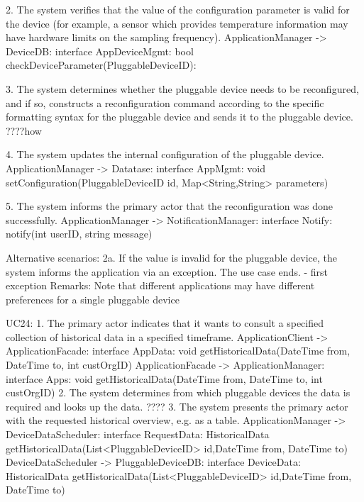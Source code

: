             2. The system verifies that the value of the configuration parameter is valid for the device (for
               example, a sensor which provides temperature information may have hardware limits on the
               sampling frequency).
               ApplicationManager -> DeviceDB: interface AppDeviceMgmt: bool checkDeviceParameter(PluggableDeviceID):

            3. The system determines whether the pluggable device needs to be reconfigured, and if so,
               constructs a reconfiguration command according to the specific formatting syntax for the
               pluggable device and sends it to the pluggable device. ????how

            4. The system updates the internal configuration of the pluggable device.
                ApplicationManager -> Datatase: interface AppMgmt:
                                                     void setConfiguration(PluggableDeviceID id, Map<String,String> parameters)

            5. The system informs the primary actor that the reconfiguration was done successfully.
                ApplicationManager -> NotificationManager: interface Notify: notify(int userID, string message)

            Alternative scenarios:
            2a. If the value is invalid for the pluggable device, the system informs the application via an
                exception. The use case ends.
                - first exception
            Remarks:
                Note that different applications may have different preferences for a single pluggable device

        UC24:
            1. The primary actor indicates that it wants to consult a specified collection of historical data in
                a specified timeframe.
                ApplicationClient -> ApplicationFacade: interface AppData:
                                                void getHistoricalData(DateTime from, DateTime to, int custOrgID)
                ApplicationFacade -> ApplicationManager: interface Apps:
                                                void getHistoricalData(DateTime from, DateTime to, int custOrgID)
            2. The system determines from which pluggable devices the data is required and looks up the data.
                 ????
            3. The system presents the primary actor with the requested historical overview, e.g. as a table.
                ApplicationManager -> DeviceDataScheduler: interface RequestData:
                                      HistoricalData getHistoricalData(List<PluggableDeviceID> id,DateTime from, DateTime to)
                DeviceDataScheduler -> PluggableDeviceDB: interface DeviceData:
                                      HistoricalData getHistoricalData(List<PluggableDeviceID> id,DateTime from, DateTime to)

